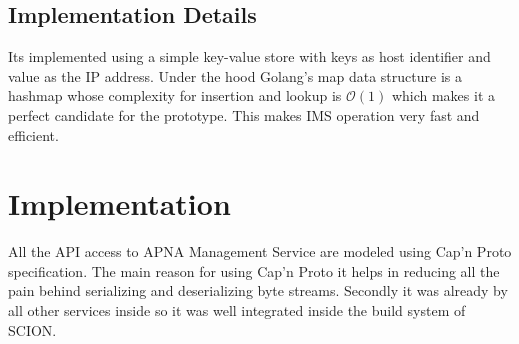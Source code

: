 \subsection{Implementation Details}
Its implemented using a simple key-value store with keys as host identifier and value as the IP address. Under the hood Golang's map data structure is a hashmap whose complexity for insertion and lookup is $\mathcal{O}(1)$ which makes it a perfect candidate for the prototype. This makes IMS operation very fast and efficient.


\section{Implementation}
All the API access to APNA Management Service are modeled using Cap’n Proto specification. The main reason for using Cap’n Proto it helps in reducing all the pain behind serializing and deserializing byte streams. Secondly it was already by all other services inside so it was well integrated inside the build system of SCION.